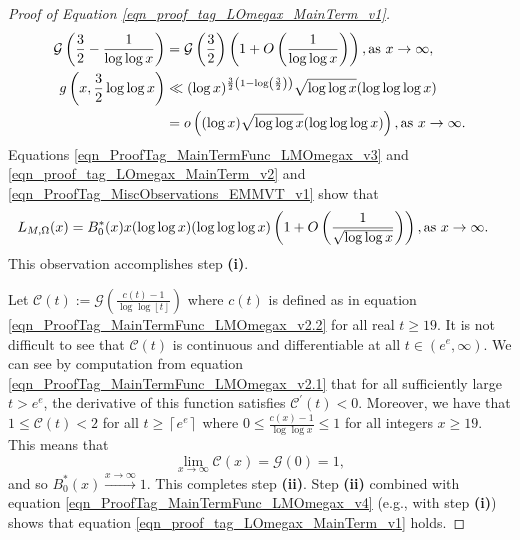 \documentclass[11pt,reqno,a4letter]{article}
\numberwithin{equation}{section}
\numberwithin{figure}{section}
\numberwithin{table}{section}
\newcommand{\ceiling}[1]{\left\lceil #1 \right\rceil}
\theoremstyle{plain}
\numberwithin{theorem}{section}
\theoremstyle{definition}
\theoremstyle{remark}
\newcommand{\mathtext}[1]{\text{\rm #1}}
\begin{document}
\begin{proof}[Proof of Equation \eqref{eqn_proof_tag_LOmegax_MainTerm_v1}]
\begin{subequations}
\begin{align}
\mathcal{G}\left(\frac{3}{2}-\frac{1}{\log\log x}\right) & = \mathcal{G}\left(\frac{3}{2}\right) 
	\left(1 + O\left(\frac{1}{\log\log x}\right)\right), 
	\mathtext{ as } x \rightarrow \infty, \\ 
g\left(x, \frac{3}{2} \log\log x\right) & \ll 
     (\log x)^{\frac{3}{2}\left(1 - \log\left(\frac{3}{2}\right)\right)} 
     \sqrt{\log\log x} (\log\log\log x) \\ 
\notag
     & = 
     o\left((\log x) \sqrt{\log\log x} (\log\log\log x)\right), 
	\mathtext{ as } x \rightarrow \infty. 
\end{align}
\end{subequations}
Equations \eqref{eqn_ProofTag_MainTermFunc_LMOmegax_v3} and 
\eqref{eqn_proof_tag_LOmegax_MainTerm_v2} and 
\eqref{eqn_ProofTag_MiscObservations_EMMVT_v1} show that 
\begin{align}
\label{eqn_ProofTag_MainTermFunc_LMOmegax_v4} 
L_{M,\Omega}(x) & = B_0^{\ast}(x) x (\log\log x) (\log\log\log x) 
     \left(1 + O\left(\frac{1}{\sqrt{\log\log x}}\right)\right), 
	\mathtext{ as } x \rightarrow \infty. 
\end{align}
This observation accomplishes step \textbf{(i)}. 

Let $\mathcal{C}(t) := \mathcal{G}\left(\frac{c(t)-1}{\log\log \left\lfloor t \right\rfloor}\right)$ where 
$c(t)$ is defined as in equation \eqref{eqn_ProofTag_MainTermFunc_LMOmegax_v2.2} 
for all real $t \geq 19$. 
It is not difficult to see that $\mathcal{C}(t)$ is continuous and differentiable at all 
$t \in \left(e^e, \infty\right)$. 
We can see by computation from equation \eqref{eqn_ProofTag_MainTermFunc_LMOmegax_v2.1} that 
for all sufficiently large $t > e^e$, the derivative of this function satisfies 
$\mathcal{C}^{\prime}(t) < 0$. 
Moreover, we have that $1 \leq \mathcal{C}(t) < 2$ for all $t \geq \ceiling{e^e}$ where 
$0 \leq \frac{c(x)-1}{\log\log x} \leq 1$ for all integers $x \geq 19$. 
This means that 
\[
\lim_{x \rightarrow \infty} \mathcal{C}(x) = \mathcal{G}(0) = 1, 
\]
and so $B_0^{\ast}(x) \xrightarrow{x \rightarrow \infty} 1$. 
This completes step \textbf{(ii)}. 
Step \textbf{(ii)} combined with equation \eqref{eqn_ProofTag_MainTermFunc_LMOmegax_v4} 
(e.g., with step \textbf{(i)}) 
shows that equation \eqref{eqn_proof_tag_LOmegax_MainTerm_v1} holds. 
\end{proof}
\end{document}
